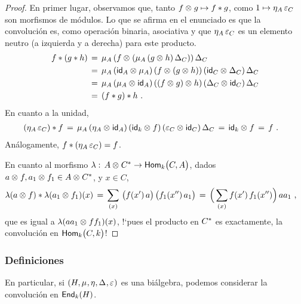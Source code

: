 \begin{proof}
	En primer lugar, observamos que, tanto $f\tensor g\mapsto f\convol g$,
	como $1\mapsto\unidad[A]\,\counidad[C]$ son morfismos de m\'{o}dulos.
	Lo que se afirma en el enunciado es que la convoluci\'{o}n es, como
	operaci\'{o}n binaria, asociativa y que $\unidad[A]\,\counidad[C]$ es
	un elemento neutro (a izquierda y a derecha) para este producto.
	\begin{align*}
		f\convol (g\convol h) & \,=\,\producto[A]\,(f\tensor
			(\producto[A]\,(g\tensor h)\,\coproducto[C]))\,
				\coproducto[C] \\
		& \,=\, \producto[A]\,(\id[A]\tensor\producto[A])\,
				(f\tensor(g\tensor h))\,
			(\id[C]\tensor\coproducto[C])\,\coproducto[C] \\
		& \,=\, \producto[A]\,(\producto[A]\tensor\id[A])\,
				((f\tensor g)\tensor h)\,
			(\coproducto[C]\tensor\id[C])\,\coproducto[C] \\
		& \,=\,(f\convol g)\convol h
		\text{ .}
	\end{align*}
	En cuanto a la unidad,
	\begin{align*}
		(\unidad[A]\,\counidad[C])\convol f & \,=\,\producto[A]\,
			(\unidad[A]\tensor\id[A])\,(\id[k]\tensor f)\,
			(\counidad[C]\tensor\id[C])\,\coproducto[C] \,=\,
			\id[k]\tensor f\,=\,f
		\text{ .}
	\end{align*}
	An\'{a}logamente, $f\convol(\unidad[A]\,\counidad[C])=f$.

	En cuanto al morfismo
	$\lambda:\,A\tensor\dual C\rightarrow\Hom[k]\big(C,A\big)$, dados
	$a\tensor f,a_1\tensor f_1\in A\tensor\dual C$, y $x\in C$,
	\begin{align*}
		\lambda(a\tensor f)\convol\lambda(a_1\tensor f_1)(x) & \,=\,
			\sum_{(x)}\,\big(f(x')\,a\big)\,\big(f_1(x'')\,a_1\big)
			\,=\,\Big(\sum_{(x)}f(x')\,f_1(x'')\Big)\,aa_1
		\text{ ,}
	\end{align*}
	que es igual a $\lambda(aa_1\tensor ff_1)(x)$, !`pues el producto en
	$\dual C$ es exactamente, la convoluci\'{o}n en $\Hom[k]\big(C,k\big)$!
\end{proof}

\subsubsection{Definiciones}

En particular, si $(H,\producto,\unidad,\coproducto,\counidad)$ es una
bi\'{a}lgebra, podemos considerar la convoluci\'{o}n en $\Endo[k](H)$.

